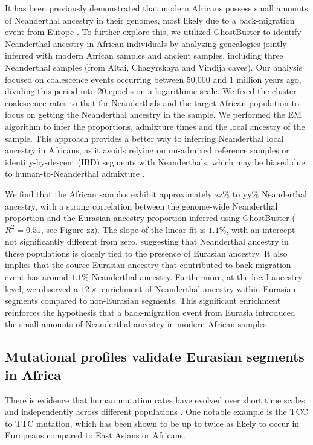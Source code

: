 It has been previously demonstrated that modern Africans possess small amounts of Neanderthal ancestry in their genomes, most likely due to a back-migration event from Europe \cite{chen2020identifying, bergstrom2020insights, wang2013apparent, hollfelder2017northeast}. To further explore this, we utilized GhostBuster to identify Neanderthal ancestry in African individuals by analyzing genealogies jointly inferred with modern African samples and ancient samples, including three Neanderthal samples (from Altai, Chagyrskaya and Vindija caves). Our analysis focused on coalescence events occurring between 50,000 and 1 million years ago, dividing this period into 20 epochs on a logarithmic scale. We fixed the cluster coalescence rates to that for Neanderthals and the target African population to focus on getting the Neanderthal ancestry in the sample. We performed the EM algorithm to infer the proportions, admixture times and the local ancestry of the sample. This approach provides a better way to inferring Neanderthal local ancestry in Africans, as it avoids relying on un-admixed reference samples or identity-by-descent (IBD) segments with Neanderthals, which may be biased due to human-to-Neanderthal admixture \cite{chen2020identifying}.

We find that the African samples exhibit approximately zz\% to yy\% Neanderthal ancestry, with a strong correlation between the genome-wide Neanderthal proportion and the Eurasian ancestry proportion inferred using GhostBuster ($R^2 = 0.51$, see Figure zz). The slope of the linear fit is $1.1$\%, with an intercept not significantly different from zero, suggesting that Neanderthal ancestry in these populations is closely tied to the presence of Eurasian ancestry. It also implies that the source Eurasian ancestry that contributed to back-migration event has around $1.1$\% Neanderthal ancestry. Furthermore, at the local ancestry level, we observed a $12 \times$ enrichment of Neanderthal ancestry within Eurasian segments compared to non-Eurasian segments. This significant enrichment reinforces the hypothesis that a back-migration event from Eurasia introduced the small amounts of Neanderthal ancestry in modern African samples. 

\subsection{Mutational profiles validate Eurasian segments in Africa}

There is evidence that human mutation rates have evolved over short time scales and independently across different populations \cite{harris2015evidence, harris2017rapid}. One notable example is the TCC to TTC mutation, which has been shown to be up to twice as likely to occur in Europeans compared to East Asians or Africans. 

